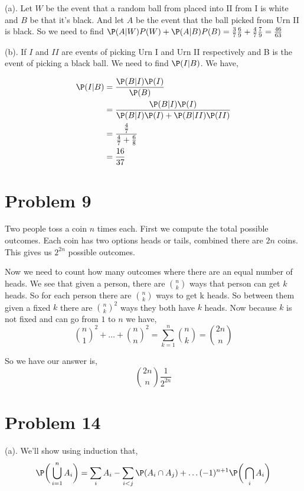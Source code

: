 \documentclass[a4paper]{report}
\begin{document}
(a). Let $W$ be the event that a random ball from placed into II from I is white and $B$ be that it's black. And let $A$ be the event that the ball picked from Urn II is black. So we need to find $\P(A | W)P(W) + \P(A | B)P(B) = \frac{3}{7}\frac{6}{9} + \frac{4}{7} \frac{7}{9} = \frac{46}{63}$

\vspace{1em}
(b). If $I$ and  $II$ are events of picking  Urn I and Urn II respectively and B is the event of picking a black ball. We need to find $\P(I | B)$. We have, 

\begin{align*}
    \P(I | B) &= \frac{\P(B | I) \P(I)}{\P(B)}\\
              &=  \frac{\P(B | I) \P(I)}{\P(B | I) \P(I) + \P(B | II) \P(II)}\\
            &= \frac{\frac{4}{7}}{\frac{4}{7} + \frac{6}{8}}\\
            &= \frac{16}{37}
\end{align*}
\section*{Problem 9}
Two people toss a coin $n$ times each. First we compute the total possible outcomes. Each coin has two options heads or tails, combined there are $2n$ coins. This gives us $2^{2n}$ possible outcomes.

\vspace{1em}
Now we need to count how many outcomes where  there are an equal number of heads. We see that given a person, there are $n \choose k$ ways that person can get $k$  heads. So for each person there are $n \choose k$ ways to get k heads. So between  them given a fixed $k$ there are ${n \choose k}^2$ ways they both have $k$ heads. Now because $k$ is not fixed and can go from $1$ to $n$ we have, 
$$ {n \choose 1}^2 + \dots + {n \choose n}^2  = \sum_{k=1}^{n} {n \choose k} = {2n \choose n}$$ 

So we have our answer is, 
$$ {2n \choose n} \frac{1}{2^{2n}} $$ 


\section*{Problem 14}
(a). We'll show using induction that, 
$$ \P \bigg (  \bigcup_{i = 1}^{n} A_i \bigg )  = \sum_{i} A_i  -\sum_{i < j} \P(A_i \cap A_j) + \dots (-1)^{n + 1} \P\bigg (\bigcap_i A_i \bigg )$$ 
\end{document}
